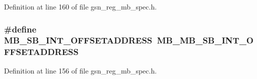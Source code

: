 Definition at line 160 of file gsn\_\-reg\_\-mb\_\-spec.h.

\hypertarget{a00562_abe34d4d6b4bc51e3bea5a1fa2e478e54}{
\subsubsection[{MB\_\-SB\_\-INT\_\-OFFSETADDRESS}]{\setlength{\rightskip}{0pt plus 5cm}\#define MB\_\-SB\_\-INT\_\-OFFSETADDRESS~MB\_\-MB\_\-SB\_\-INT\_\-OFFSETADDRESS}}
\label{a00562_abe34d4d6b4bc51e3bea5a1fa2e478e54}


Definition at line 156 of file gsn\_\-reg\_\-mb\_\-spec.h.

